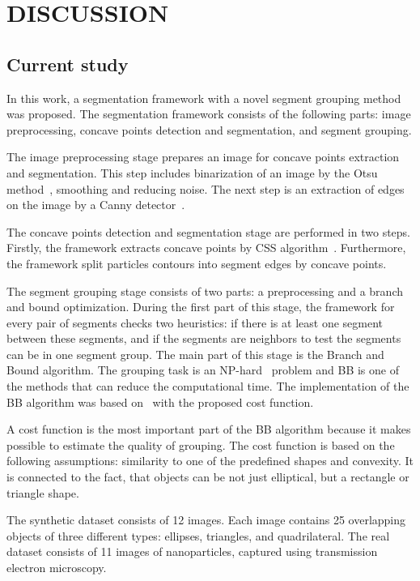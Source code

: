 \documentclass{lutmscthesis}[2010/09/22]
\begin{document}
\section{DISCUSSION}
\label{sec:discussion}

\subsection{Current study}


In this work, a segmentation framework with a novel segment grouping method was proposed. The segmentation framework consists of the following parts: image preprocessing, concave points detection and segmentation, and segment grouping.

The image preprocessing stage prepares an image for concave points extraction and segmentation. This step includes binarization of an image by the Otsu method~\cite{otsu}, smoothing and reducing noise. The next step is an extraction of edges on the image by a Canny detector~\cite{Canny}. 

The concave points detection and segmentation stage are performed in two steps. Firstly, the framework extracts concave points by CSS algorithm~\cite{CSS}. Furthermore, the framework split particles contours into segment edges by concave points. 

The segment grouping stage consists of two parts: a preprocessing and a branch and bound optimization. During the first part of this stage, the framework for every pair of segments checks two heuristics: if there is at least one segment between these segments, and if the segments are neighbors to test the segments can be in one segment group. The main part of this stage is the Branch and Bound algorithm. The grouping task is an NP-hard~\cite{zafari-bb} problem and BB is one of the methods that can reduce the computational time. The implementation of the BB algorithm was based on~\cite{zafari-bb} with the proposed cost function.

A cost function is the most important part of the BB algorithm because it makes possible to estimate the quality of grouping. The cost function is based on the following assumptions: similarity to one of the predefined shapes and convexity. It is connected to the fact, that objects can be not just elliptical, but a rectangle or triangle shape. 

The synthetic dataset consists of 12 images. Each image contains 25 overlapping objects of three different types: ellipses, triangles, and quadrilateral. The real dataset consists of 11 images of nanoparticles, captured
using transmission electron microscopy.
\end{document}
